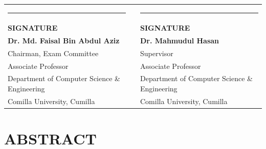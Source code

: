 \documentclass[12pt,a4paper]{report}
\begin{document}
\vfill

\noindent
{\fontsize{10}{12}\selectfont
\begin{tabular}{@{}p{}c p{}@{}}
\rule{7.0cm}{0.5pt} & \hspace{0.2cm} & \rule{7.0cm}{0.5pt} \\
\textbf{SIGNATURE} & & \textbf{SIGNATURE} \\
\textbf{Dr. Md. Faisal Bin Abdul Aziz} & & \textbf{Dr. Mahmudul Hasan} \\
Chairman, Exam Committee & & Supervisor \\
Associate Professor & & Associate Professor \\
Department of Computer Science \& Engineering & & Department of Computer Science \& Engineering \\
Comilla University, Cumilla & & Comilla University, Cumilla \\
\end{tabular}}

\vspace{2cm}

\newpage
\setcounter{page}{3}
\chapter*{ABSTRACT}
\end{document}
